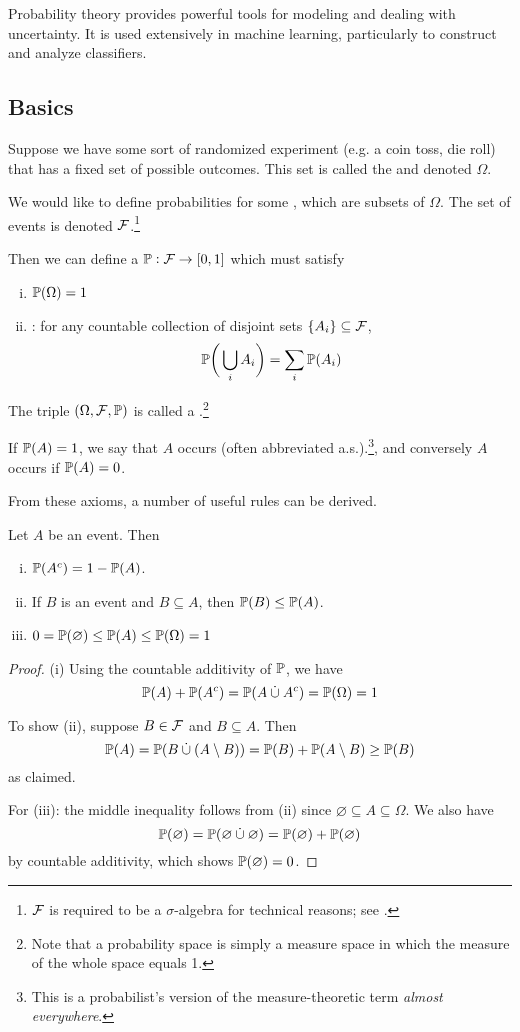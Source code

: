 Probability theory provides powerful tools for modeling and dealing with uncertainty.
It is used extensively in machine learning, particularly to construct and analyze classifiers.

\subsection{Basics}
Suppose we have some sort of randomized experiment (e.g. a coin toss, die roll) that has a fixed set of possible outcomes.
This set is called the  and denoted $\Omega$.

We would like to define probabilities for some , which are subsets of $\Omega$.
The set of events is denoted $\calF$.\footnote{
    $\calF$ is required to be a $\sigma$-algebra for technical reasons; see \cite{rigorousprob}.
}

Then we can define a  $\P : \calF \to [0,1]$ which must satisfy
\begin{enumerate}[(i)]
\item $\pr{\Omega} = 1$
\item {}: for any countable collection of disjoint sets $\{A_i\} \subseteq \calF$,
\[\prbigg{\bigcup_i A_i} = \sum_i \pr{A_i}\]
\end{enumerate}
The triple $(\Omega, \calF, \P)$ is called a .\footnote{
    Note that a probability space is simply a measure space in which the measure of the whole space equals 1.
}

If $\pr{A} = 1$, we say that $A$ occurs  (often abbreviated a.s.).\footnote{
    This is a probabilist's version of the measure-theoretic term \textit{almost everywhere}.
}, and conversely $A$ occurs  if $\pr{A} = 0$.

From these axioms, a number of useful rules can be derived.
\begin{proposition}
Let $A$ be an event. Then
\begin{enumerate}[(i)]
\item $\pr{A^c} = 1 - \pr{A}$.
\item If $B$ is an event and $B \subseteq A$, then $\pr{B} \leq \pr{A}$.
\item $0 = \pr{\varnothing} \leq \pr{A} \leq \pr{\Omega} = 1$
\end{enumerate}
\end{proposition}
\begin{proof}
(i) Using the countable additivity of $\P$, we have
\[\pr{A} + \pr{A^c} = \pr{A \dotcup A^c} = \pr{\Omega} = 1\]

To show (ii), suppose $B \in \calF$ and $B \subseteq A$. Then
\[\pr{A} = \pr{B \dotcup (A \setminus B)} = \pr{B} + \pr{A \setminus B} \geq \pr{B}\]
as claimed.

For (iii): the middle inequality follows from (ii) since $\varnothing \subseteq A \subseteq \Omega$.
We also have
\[\pr{\varnothing} = \pr{\varnothing \dotcup \varnothing} = \pr{\varnothing} + \pr{\varnothing}\]
by countable additivity, which shows $\pr{\varnothing} = 0$.
\end{proof}

